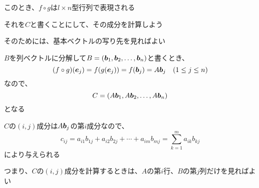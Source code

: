 \documentclass[../../../topic_linear-algebra]{subfiles}
\begin{document}
\br

このとき、$f \circ g$は$l \times n$型行列で表現される

それを$C$と書くことにして、その成分を計算しよう

そのためには、基本ベクトルの写り先を見ればよい

\br

$B$を列ベクトルに分解して$B = (\vb*{b}_1, \vb*{b}_2, \dots, \vb*{b}_n)$と書くとき、
\begin{equation*}
  (f \circ g)(\vb*{e}_j) = f(g(\vb*{e}_j)) = f(\vb*{b}_j) = A \vb*{b}_j \quad (1 \leq j \leq n)
\end{equation*}
なので、
\begin{equation*}
  C = (A\vb*{b}_1, A\vb*{b}_2, \dots, A\vb*{b}_n)
\end{equation*}
となる

$C$の$(i, j)$成分は$A\vb*{b}_j$の第$i$成分なので、
\begin{equation*}
  c_{ij} = a_{i1} b_{1j} + a_{i2} b_{2j} + \cdots + a_{im} b_{mj} = \sum_{k=1}^m a_{ik} b_{kj}
\end{equation*}
により与えられる

つまり、$C$の$(i, j)$成分を計算するときは、$A$の第$i$行、$B$の第$j$列だけを見ればよい
\end{document}
